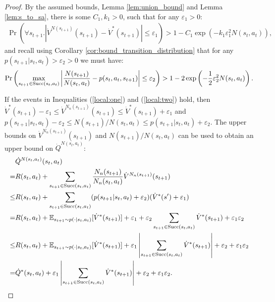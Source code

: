 \documentclass{article}
\newcommand{\bb}[1]{\mathbb{#1}}
\newcommand{\succc}[2]{\textnormal{Succ}(#1,#2)}
\theoremstyle{plain}
\begin{document}
\begin{appendices}
        \begin{proof}
            By the assumed bounds, Lemma \ref{lem:union_bound} and Lemma \ref{lem:s_to_sa}, there is some $C_1,k_1>0$, such that for any $\varepsilon_1 >0$:
            \begin{align}
                \Pr\left(\forall s_{t+1}. \left|\dot{V}^{N(s_{t+1})}(s_{t+1})-\dot{V}^*(s_{t+1}) \right| \leq \varepsilon_1 \right) > 1-C_1\exp(-k_1\varepsilon_1^2 N(s_t,a_t)), \label{local:one}
            \end{align}
            and recall using Corollary \ref{cor:bound_transition_distribution} that for any $p(s_{t+1}|s_t,a_t) > \varepsilon_2>0$ we must have:
            \begin{align}
                \Pr\left(\max_{s_{t+1}\in\succc{s_t}{a_t}} 
                    \left| \frac{N(s_{t+1})}{N(s_t,a_t)} - p(s_t,a_t,s_{t+1}) \right| 
                    \leq \varepsilon_2 \right) 
                        > 1 - 2 \exp\left(-\frac{1}{2}\varepsilon_2^2 N(s_t,a_t) \right). \label{local:two}
            \end{align}
            
            If the events in Inequalities (\ref{local:one}) and (\ref{local:two}) hold, then $\dot{V}^*(s_{t+1})- \varepsilon_1 \leq \dot{V}^{N_n(s_{t+1})}(s_{t+1}) \leq \dot{V}^*(s_{t+1})+ \varepsilon_1$ and $p(s_{t+1}|s_t,a_t) - \varepsilon_2 \leq N(s_{t+1})/N(s_t,a_t) \leq p(s_{t+1}|s_t,a_t) + \varepsilon_2$. The upper bounds on $\dot{V}^{N_n(s_{t+1})}(s_{t+1})$ and $N(s_{t+1})/N(s_t,a_t)$ can be used to obtain an upper bound on $\dot{Q}^{N(s_t,a_t)}$: 
            \begin{align}
                &\dot{Q}^{N(s_t,a_t)}(s_t,a_t) \\
                    =& R(s_t,a_t) 
                        + \sum_{s_{t+1}\in\succc{s_t}{a_t}}\frac{N_n(s_{t+1})}{N_n(s_t,a_t)} 
                            \dot{V}^{N_n(s_{t+1})}(s_{t+1}) \\
                    \leq& R(s_t,a_t) 
                        + \sum_{s_{t+1}\in\succc{s_t}{a_t}}(p(s_{t+1}|s_t,a_t)+\varepsilon_2)
                            (\dot{V}^*(s')+\varepsilon_1) \\
                    =& R(s_t,a_t) 
                        + \bb{E}_{s_{t+1}\sim p(\cdot|s_t,a_t)}[\dot{V}^*(s_{t+1})] 
                        + \varepsilon_1 
                        + \varepsilon_2\sum_{s_{t+1}\in\succc{s_t}{a_t}} \dot{V}^*(s_{t+1}) 
                        + \varepsilon_1 \varepsilon_2 \\
                    \leq& R(s_t,a_t) 
                        + \bb{E}_{s_{t+1}\sim p(\cdot|s_t,a_t)}[\dot{V}^*(s_{t+1})] 
                        + \varepsilon_1\left|\sum_{s_{t+1}\in\succc{s_t}{a_t}} \dot{V}^*(s_{t+1})\right| 
                        + \varepsilon_2 + \varepsilon_1 \varepsilon_2 \\
                    =& \dot{Q}^*(s_t,a_t) 
                        + \varepsilon_1\left|\sum_{s_{t+1}\in\succc{s_t}{a_t}} \dot{V}^*(s_{t+1})\right| 
                        + \varepsilon_2 
                        + \varepsilon_1 \varepsilon_2.
            \end{align}
            

\end{proof}
\end{appendices}
\end{document}
